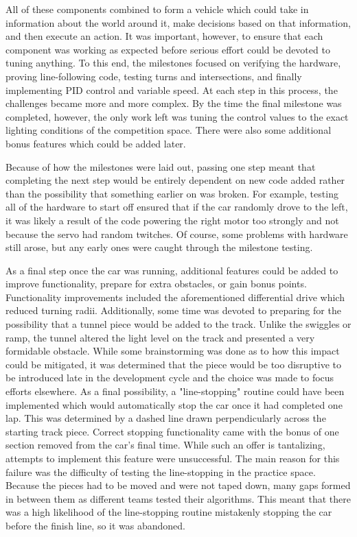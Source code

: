 \documentclass[conference]{IEEEtran}
\begin{document}
    All of these components combined to form a vehicle which could take in
    information about the world around it, make decisions based on that
    information, and then execute an action. It was important, however, to
    ensure that each component was working as expected before serious effort
    could be devoted to tuning anything. To this end, the milestones focused
    on verifying the hardware, proving line-following code, testing turns and
    intersections, and finally implementing PID control and variable speed.
    At each step in this process, the challenges became more and more complex.
    By the time the final milestone was completed, however, the only work left
    was tuning the control values to the exact lighting conditions of the
    competition space. There were also some additional bonus features which
    could be added later.

    Because of how the milestones were laid out, passing one step meant that
    completing the next step would be entirely dependent on new code added
    rather than the possibility that something earlier on was broken. For
    example, testing all of the hardware to start off ensured that if the car
    randomly drove to the left, it was likely a result of the code powering
    the right motor too strongly and not because the servo had random
    twitches. Of course, some problems with hardware still arose, but any
    early ones were caught through the milestone testing.

    As a final step once the car was running, additional features could be
    added to improve functionality, prepare for extra obstacles, or gain bonus
    points. Functionality improvements included the aforementioned
    differential drive which reduced turning radii. Additionally, some time
    was devoted to preparing for the possibility that a tunnel piece would be
    added to the track. Unlike the swiggles or ramp, the tunnel altered the
    light level on the track and presented a very formidable obstacle. While
    some brainstorming was done as to how this impact could be mitigated, it
    was determined that the piece would be too disruptive to be introduced
    late in the development cycle and the choice was made to focus efforts
    elsewhere. As a final possibility, a "line-stopping" routine could have
    been implemented which would automatically stop the car once it had
    completed one lap. This was determined by a dashed line drawn
    perpendicularly across the starting track piece. Correct stopping
    functionality came with the bonus of one section removed from the car's
    final time. While such an offer is tantalizing, attempts to implement
    this feature were unsuccessful. The main reason for this failure was the
    difficulty of testing the line-stopping in the practice space. Because the
    pieces had to be moved and were not taped down, many gaps formed in
    between them as different teams tested their algorithms. This meant that
    there was a high likelihood of the line-stopping routine mistakenly
    stopping the car before the finish line, so it was abandoned.
\end{document}
